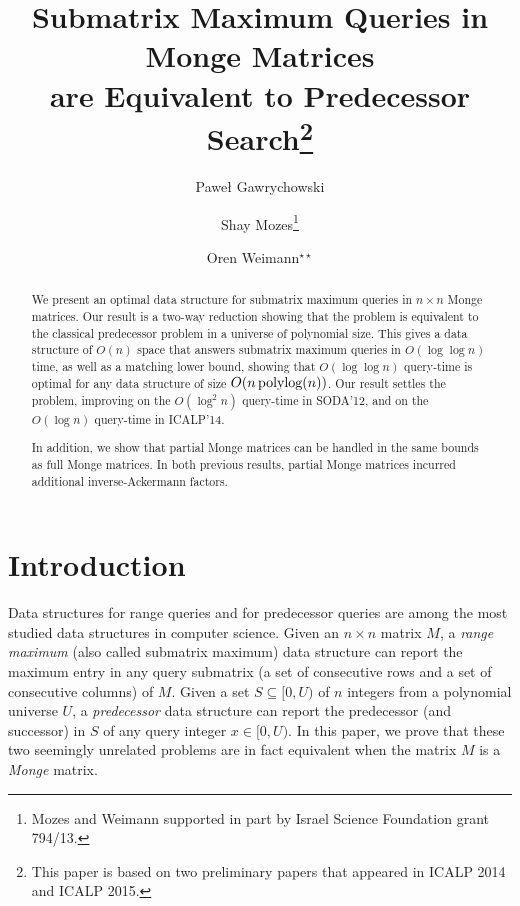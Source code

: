\documentclass{llncs}
\newcommand{\polylog}{\text{\,polylog}}
\begin{document}
\title{Submatrix Maximum Queries in Monge Matrices\\ are
Equivalent to Predecessor Search\thanks{This paper is based on two preliminary papers that appeared in ICALP 2014 and ICALP 2015.}}

\author{
Pawe{\l} Gawrychowski \and Shay Mozes\thanks{Mozes and Weimann supported in part by
  Israel Science Foundation grant 794/13.} \and Oren Weimann$^{\star\star}$
}


\date{}
\maketitle

\begin{abstract}
We present an optimal data structure for submatrix maximum
queries in $n\times n$ Monge matrices.
Our result is a two-way reduction showing that the problem is
equivalent to the classical predecessor problem in a universe of polynomial size. This gives a data
structure of $O(n)$ space that answers submatrix maximum queries in
$O(\log\log n)$ time, as well as a matching lower bound, showing that $O(\log\log n)$ query-time is optimal for any data structure
of size $O(n\polylog(n))$. 
Our result settles the problem, improving on the $O(\log^2 n)$
query-time in SODA'12, and on the $O(\log n)$ query-time in ICALP'14. 

In addition, we show that partial Monge matrices can be handled in the same bounds as full Monge matrices. In both previous results, partial Monge matrices incurred additional inverse-Ackermann factors.
\end{abstract}


 
\section{Introduction}
Data structures for range queries and for predecessor queries are
among the most studied data structures in computer science. Given an
$n \times n$ matrix $M$,  a {\em range maximum} (also called submatrix
maximum) data structure can report the maximum entry in any query
submatrix (a set of consecutive rows and a set of consecutive columns)
of $M$. Given a set $S\subseteq [0,U)$ of $n$ integers from a
polynomial universe $U$, 
a {\em predecessor} data structure can report the predecessor (and successor) in $S$ of any query integer $x\in  [0,U)$. 
In this paper, we prove that these two seemingly unrelated problems are in fact equivalent when the matrix $M$ is a {\em Monge} matrix.
\end{document}

